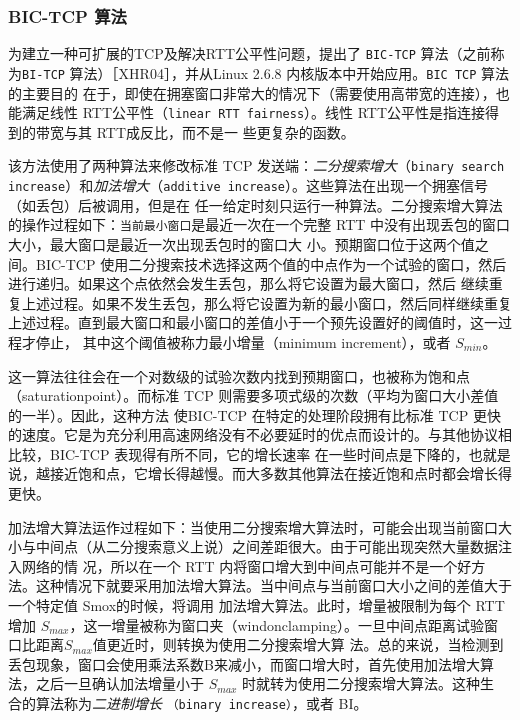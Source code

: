 \subsubsection{BIC-TCP 算法}
为建立一种可扩展的TCP及解决RTT公平性问题，提出了 \verb|BIC-TCP| 算法（之前称为\verb|BI-TCP| 算法）［XHR04］，并从Linux 2.6.8 内核版本中开始应用。\verb|BIC TCP| 算法的主要目的
在于，即使在拥塞窗口非常大的情况下（需要使用高带宽的连接），也能满足线性 RTT公平性（\verb|linear RTT fairness|）。线性 RTT公平性是指连接得到的带宽与其 RTT成反比，而不是一
些更复杂的函数。

该方法使用了两种算法来修改标准 TCP 发送端：\emph{二分搜索增大}（\verb|binary search increase|）和\emph{加法增大}（\verb|additive increase|）。这些算法在出现一个拥塞信号（如丢包）后被调用，但是在
任一给定时刻只运行一种算法。二分搜索增大算法的操作过程如下：\verb|当前最小窗口|是最近一次在一个完整 RTT 中没有出现丢包的窗口大小，最大窗口是最近一次出现丢包时的窗口大
小。预期窗口位于这两个值之间。BIC-TCP 使用二分搜索技术选择这两个值的中点作为一个试验的窗口，然后进行递归。如果这个点依然会发生丢包，那么将它设置为最大窗口，然后
继续重复上述过程。如果不发生丢包，那么将它设置为新的最小窗口，然后同样继续重复上述过程。直到最大窗口和最小窗口的差值小于一个预先设置好的阈值时，这一过程才停止，
其中这个阈值被称力最小增量（minimum increment），或者 $S_{min}$。

这一算法往往会在一个对数级的试验次数内找到预期窗口，也被称为饱和点（saturationpoint）。而标准 TCP 则需要多项式级的次数（平均为窗口大小差值的一半）。因此，这种方法
使BIC-TCP 在特定的处理阶段拥有比标准 TCP 更快的速度。它是为充分利用高速网络没有不必要延时的优点而设计的。与其他协议相比较，BIC-TCP 表现得有所不同，它的增长速率
在一些时间点是下降的，也就是说，越接近饱和点，它增长得越慢。而大多数其他算法在接近饱和点时都会增长得更快。

加法增大算法运作过程如下：当使用二分搜索增大算法时，可能会出现当前窗口大小与中间点（从二分搜索意义上说）之间差距很大。由于可能出现突然大量数据注入网络的情
况，所以在一个 RTT 内将窗口增大到中间点可能并不是一个好方法。这种情况下就要采用加法增大算法。当中间点与当前窗口大小之间的差值大于一个特定值 Smox的时候，将调用
加法增大算法。此时，增量被限制为每个 RTT增加 $S_{max}$，这一增量被称为窗口夹（windonclamping）。一旦中间点距离试验窗口比距离$S_{max}$值更近时，则转换为使用二分搜索增大算
法。总的来说，当检测到丢包现象，窗口会使用乘法系数B来减小，而窗口增大时，首先使用加法增大算法，之后一旦确认加法增量小于 $S_{max}$ 时就转为使用二分搜索增大算法。这种生
合的算法称为\emph{二进制增长} \verb|（binary increase）|，或者 BI。

